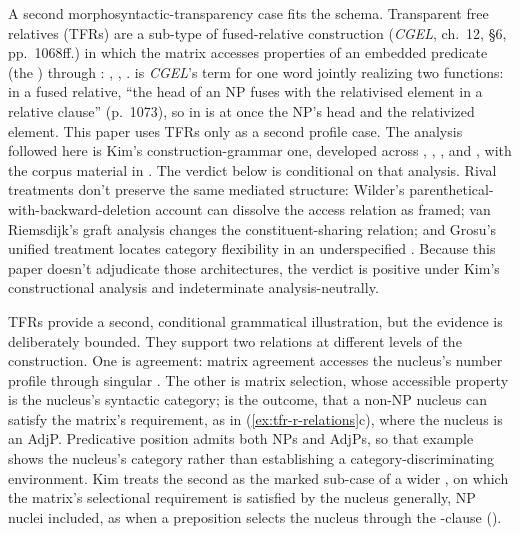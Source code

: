 A second morphosyntactic-transparency case fits the schema. Transparent free relatives (TFRs) are a sub-type of fused-relative construction (\textit{CGEL}, ch.~12, §6, pp.~1068ff.) in which the matrix accesses properties of an embedded predicate (the ) through : , , .  is \textit{CGEL}'s term for one word jointly realizing two functions: in a fused relative, \enquote{the head of an NP fuses with the relativised element in a relative clause} (p.~1073), so  in  is at once the NP's head and the relativized element. This paper uses TFRs only as a second profile case. The analysis followed here is Kim's construction-grammar one, developed across \textcite{kim-2011-tfrs}, \textcite{kim-2017-free-relatives}, \textcite[ch.~6.8]{kim-2026-form-function}, and \textcite[§5]{kim-2026-indeterminacy-free-relatives}, with the corpus material in \textcite{kim-reynolds-2026-two-kinds-transparency}. The verdict below is conditional on that analysis. Rival treatments don't preserve the same mediated structure: Wilder's \autocite*{wilder-1999-transparent-free-relatives} parenthetical-with-backward-deletion account can dissolve the access relation as framed; van Riemsdijk's \autocite*{vanriemsdijk-2006-free-relatives} graft analysis changes the constituent-sharing relation; and Grosu's \autocite*{grosu-2003-unified-theory-tfrs} unified treatment locates category flexibility in an underspecified . Because this paper doesn't adjudicate those architectures, the verdict is positive under Kim's constructional analysis and indeterminate analysis-neutrally.

\ea\label{ex:tfr-r-relations}
\ea {}
\ex {}
\ex {}
\z
\z

TFRs provide a second, conditional grammatical illustration, but the evidence is deliberately bounded. They support two relations at different levels of the construction. One is agreement: matrix agreement accesses the nucleus's number profile through singular . The other is matrix selection, whose accessible property is the nucleus's syntactic category;  is the outcome, that a non-NP nucleus can satisfy the matrix's requirement, as in (\ref{ex:tfr-r-relations}c), where the nucleus is an AdjP. Predicative position admits both NPs and AdjPs, so that example shows the nucleus's category rather than establishing a category-discriminating environment. Kim \autocite*[36--37]{kim-2026-indeterminacy-free-relatives} treats the second as the marked sub-case of a wider , on which the matrix's selectional requirement is satisfied by the nucleus generally, NP nuclei included, as when a preposition selects the nucleus through the -clause ().

